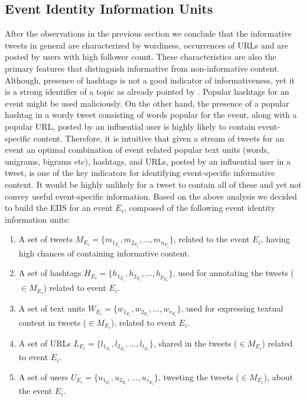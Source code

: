 \subsection{Event Identity Information Units}
After the observations in the previous section we conclude that the informative tweets in general are characterized by wordiness, occurrences of URLs and are posted by users with high follower count. These characteristics are also the primary features that distinguish informative from non-informative content. Although, presence of hashtags is not a good indicator of informativeness, yet it is a strong identifier of a topic as already pointed by \cite{laniado2010making}. Popular hashtags for an event might be used maliciously. On the other hand, the presence of a popular hashtag in a wordy tweet consisting of words popular for the event, along with a popular URL, posted by an influential user is highly likely to contain event-specific content. Therefore, it is intuitive that given a stream of tweets for an event an optimal combination of event related popular text units (words, unigrams, bigrams etc),  hashtags, and URLs, posted by an influential user in a tweet, is one of the key indicators for identifying event-specific informative content. It would be highly unlikely for a tweet to contain all of these and yet not convey useful event-specific information. Based on the above analysis we decided to build the EIIS for an event $E_{i}$, composed of the following event identity information units:

\begin{enumerate}
\item A set of tweets $M_{E_{i}} = {\{m_{1_{E_{i}}},m_{2_{E_{i}}}, ... ,m_{n_{E_{i}}}\}}$, related to the event $E_{i}$, having high chances of containing informative content.
\item A set of hashtags $H_{E_{i}} = \{h_{1_{E_{i}}},h_{2_{E_{i}}},..., h_{p_{E_{i}}} \}$, used for annotating the tweets ($\in M_{E_{i}}$) related to event $E_{i}$.
\item A set of text units $W_{E_{i}} = \{w_{1_{E_{i}}},w_{2_{E_{i}}},..., w_{r_{E_{i}}} \}$, used for expressing textual content in tweets ($\in M_{E_{i}}$), related to event $E_{i}$.
\item A set of URLs $L_{E_{i}} = \{l_{1_{E_{i}}},l_{2_{E_{i}}},..., l_{t_{E_{i}}} \}$, shared in the tweets ($\in M_{E_{i}}$) related to event $E_{i}$.
\item A set of users $U_{E_{i}} = \{u_{1_{E_{i}}},u_{2_{E_{i}}},..., u_{s_{E_{i}}} \}$, tweeting the tweets ($\in M_{E_{i}}$), about the event $E_{i}$.
\end{enumerate}

